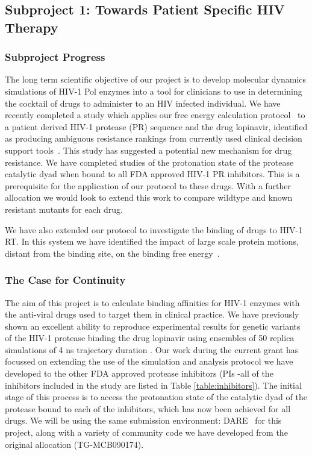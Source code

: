 \documentclass[a4paper,10pt]{article}
\begin{document}
\subsection{Subproject 1: Towards Patient Specific HIV Therapy}

\subsubsection{Subproject Progress}
The long term scientific objective of our project is to develop molecular dynamics simulations of HIV-1 Pol enzymes into a tool for clinicians to use in determining the cocktail of drugs to administer to an HIV infected individual. We have recently completed a study which applies our free energy calculation protocol~\cite{Ref2} to a patient derived HIV-1 protease (PR) sequence and the drug lopinavir, identified as producing ambiguous resistance rankings from currently used clinical decision support tools~\cite{Ref3}. This study has suggested a potential new mechanism for drug resistance. We have completed studies of the protonation state of the protease catalytic dyad when bound to all FDA approved HIV-1 PR inhibitors. This is a prerequisite for the application of our protocol to these drugs. With a further allocation we would look to extend this work to compare wildtype and known resistant mutants for each drug.

We have also extended our protocol to investigate the binding of drugs to HIV-1 RT. In this system we have identified the impact of large scale protein motions, distant from the binding site, on the binding free energy~\cite{Ref4}.


\subsubsection{The Case for Continuity}

The aim of this project is to calculate binding affinities for HIV-1 enzymes with the anti-viral 
drugs used to target them in clinical practice. We have previously shown an excellent ability to
reproduce experimental results for genetic variants of the HIV-1 protease binding the drug 
lopinavir using ensembles of 50 replica simulations of 4 ns trajectory duration \cite{Sadiq2010}. 
Our work during the current grant has focussed on extending the use of the simulation and analysis 
protocol we have developed to the other FDA approved protease inhibitors (PIs -all of the inhibitors 
included in the study are listed in Table \ref{table:inhibitors}). 
The initial stage of this process is to access the protonation state of the catalytic dyad of the 
protease bound to each of the inhibitors, which has now been achieved for all drugs. We will be
using the same submission environment: DARE~\cite{DARE} for this project, along with a variety
of community code we have developed from the original allocation (TG-MCB090174).
\end{document}
